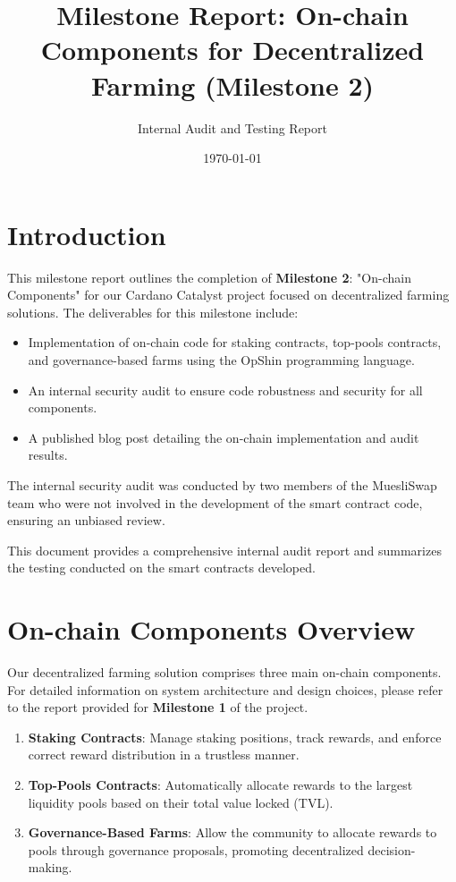 \documentclass{article}
\title{Milestone Report: On-chain Components for Decentralized Farming (Milestone 2)}
\author{Internal Audit and Testing Report}
\date{\today}
\begin{document}
\maketitle

\tableofcontents

\section{Introduction}
This milestone report outlines the completion of \textbf{Milestone 2}: "On-chain Components" for our Cardano Catalyst project focused on decentralized farming solutions. The deliverables for this milestone include:

\begin{itemize}
    \item Implementation of on-chain code for staking contracts, top-pools contracts, and governance-based farms using the OpShin programming language.
    \item An internal security audit to ensure code robustness and security for all components.
    \item A published blog post detailing the on-chain implementation and audit results.
\end{itemize}

The internal security audit was conducted by two members of the MuesliSwap team who were not involved in the development of the smart contract code, ensuring an unbiased review.

This document provides a comprehensive internal audit report and summarizes the testing conducted on the smart contracts developed.

\section{On-chain Components Overview}

Our decentralized farming solution comprises three main on-chain components. For detailed information on system architecture and design choices, please refer to the report provided for \textbf{Milestone 1} of the project.

\begin{enumerate}
    \item \textbf{Staking Contracts}: Manage staking positions, track rewards, and enforce correct reward distribution in a trustless manner.
    \item \textbf{Top-Pools Contracts}: Automatically allocate rewards to the largest liquidity pools based on their total value locked (TVL).
    \item \textbf{Governance-Based Farms}: Allow the community to allocate rewards to pools through governance proposals, promoting decentralized decision-making.
\end{enumerate}
\end{document}
